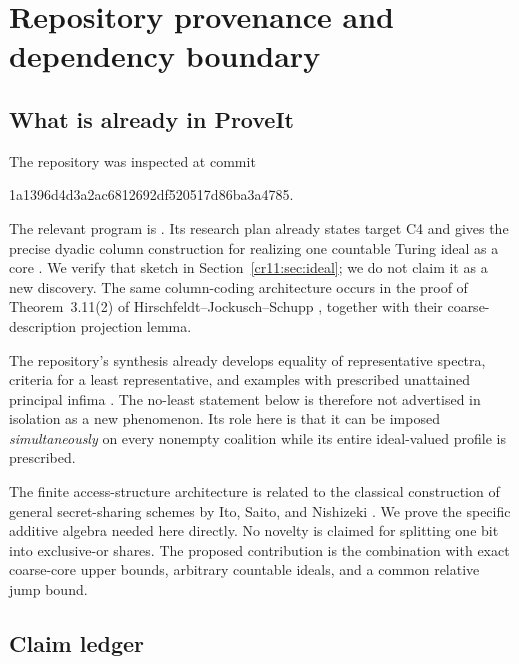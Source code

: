 \documentclass[11pt,letterpaper]{article}
\theoremstyle{plain}
\theoremstyle{definition}
\theoremstyle{remark}
\numberwithin{equation}{section}
\begin{document}
\section{Repository provenance and dependency boundary}\label{cr11:sec:provenance}

\subsection{What is already in ProveIt}

The repository was inspected at commit
\begin{center}\small\ttfamily
1a1396d4d3a2ac6812692df520517d86ba3a4785.
\end{center}
The relevant program is
.
Its research plan already states target C4 and gives the precise dyadic
column construction for realizing one countable Turing ideal as a core
\cite{RepoPlan}. We verify that sketch in Section~\ref{cr11:sec:ideal}; we do not
claim it as a new discovery. The same column-coding architecture occurs in
the proof of Theorem~3.11(2) of Hirschfeldt--Jockusch--Schupp
\cite{HJS}, together with their coarse-description projection lemma.

The repository's synthesis already develops equality of representative
spectra, criteria for a least representative, and examples with prescribed
unattained principal infima \cite{RepoSynthesis}. The no-least statement
below is therefore not advertised in isolation as a new phenomenon. Its
role here is that it can be imposed \emph{simultaneously} on every nonempty
coalition while its entire ideal-valued profile is prescribed.

The finite access-structure architecture is related to the classical
construction of general secret-sharing schemes by Ito, Saito, and Nishizeki
\cite{ISN}. We prove the specific additive algebra needed here directly.
No novelty is claimed for splitting one bit into exclusive-or shares. The
proposed contribution is the combination with exact coarse-core upper
bounds, arbitrary countable ideals, and a common relative jump bound.

\subsection{Claim ledger}
\end{document}
